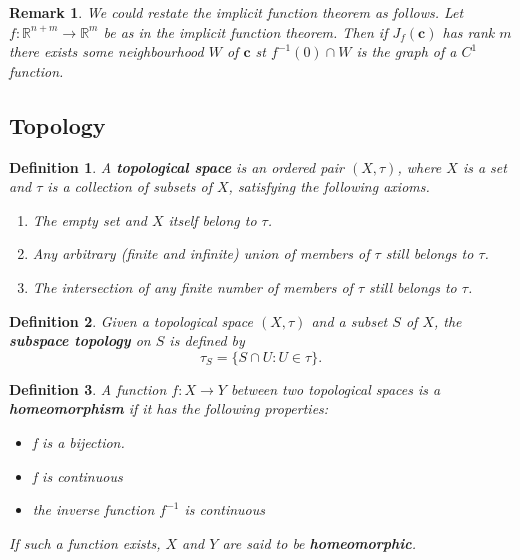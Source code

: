 \documentclass[12pt]{article}
\newcommand{\real}{\mathbb{R}}
\newcommand\inv[1]{#1^{-1}}
\newcommand\set[1]{\{#1\}}
\newtheorem{defn}{Definition}[thm]
\newtheorem*{remark}{Remark}
\begin{document}
\begin{remark}
  We could restate the implicit function theorem as follows. Let $f: \real^{n+m} \to \real^m$ be as in the implicit function theorem. Then if $J_f(\mathbf{c})$ has rank $m$ there exists  some neighbourhood $W$ of $\mathbf{c}$ st $\inv{f}(0) \cap W$ is the graph
  of a $C^1$ function.
\end{remark}
  

\subsection{Topology}

\begin{defn}
  A \textbf{topological space} is an ordered pair $(X, \tau)$, where $X$ is a set and $\tau$ is a collection of subsets of $X$, satisfying the following axioms.
  \begin{enumerate}
  \item The empty set and $X$ itself belong to $\tau$.
  \item Any arbitrary (finite and infinite) union of members of $\tau$ still belongs to $\tau$.
  \item The intersection of any finite number of members of $\tau$ still belongs to $\tau$.
  \end{enumerate}
\end{defn}

\begin{defn}
  Given a topological space $(X, \tau)$ and a subset $S$ of $X$, the \textbf{subspace topology} on $S$ is defined by
  \begin{equation*}
    \tau_S = \set{S \cap U : U \in \tau}.
  \end{equation*}
\end{defn}

\begin{defn}
  A function $f: X \to Y$ between two topological spaces is a \textbf{homeomorphism} if it has the following properties:
  \begin{itemize}
  \item f is a bijection.
  \item f is continuous
  \item the inverse function $\inv{f}$ is continuous 
  \end{itemize}
  If such a function exists, $X$ and $Y$ are said to be \textbf{homeomorphic}.
\end{defn}
\end{document}
